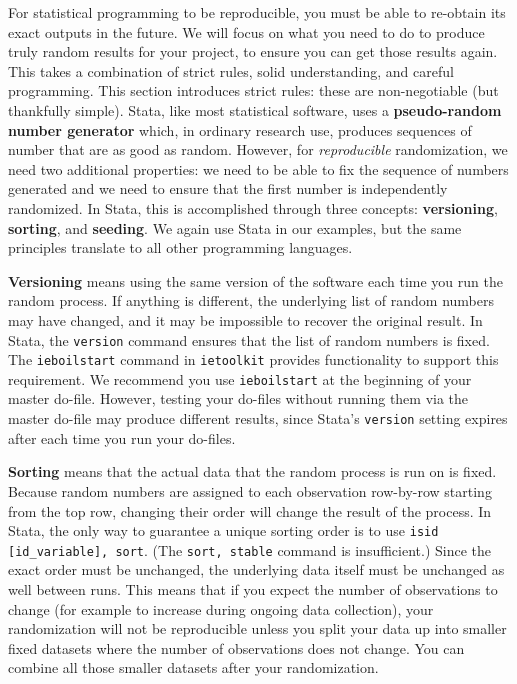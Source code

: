 For statistical programming to be reproducible,
you must be able to re-obtain its exact outputs in the future.\cite{orozco2018make}
We will focus on what you need to do to produce
truly random results for your project,
to ensure you can get those results again.
This takes a combination of strict rules, solid understanding, and careful programming.
This section introduces strict rules:
these are non-negotiable (but thankfully simple).
Stata, like most statistical software, uses a \textbf{pseudo-random number generator}
which, in ordinary research use, 
produces sequences of number that are as good as random.
However, for \textit{reproducible} randomization, we need two additional properties:
we need to be able to fix the sequence of numbers generated and
we need to ensure that the first number is independently randomized.
In Stata, this is accomplished through three concepts:
\textbf{versioning}, \textbf{sorting}, and \textbf{seeding}.
We again use Stata in our examples,
but the same principles translate to all other programming languages.

\textbf{Versioning} means using the same version of the software each time you run the random process.
If anything is different, the underlying list of random numbers may have changed,
and it may be impossible to recover the original result.
In Stata, the \texttt{version} command ensures that the list of random numbers is fixed.
The \texttt{ieboilstart} command in \texttt{ietoolkit} provides functionality to support this requirement.
We recommend you use \texttt{ieboilstart} at the beginning of your master do-file.
However, testing your do-files without running them
via the master do-file may produce different results,
since Stata's \texttt{version} setting expires after each time you run your do-files.

\textbf{Sorting} means that the actual data that the random process is run on is fixed.
Because random numbers are assigned to each observation row-by-row starting from
the top row,
changing their order will change the result of the process.
In Stata, the only way to guarantee a unique sorting order is to use
\texttt{isid [id\_variable], sort}.
(The \texttt{sort, stable} command is insufficient.)
Since the exact order must be unchanged,
the underlying data itself must be unchanged as well between runs.
This means that if you expect the number of observations to change
(for example to increase during ongoing data collection),
your randomization will not be reproducible unless you split your data up into
smaller fixed datasets where the number of observations does not change.
You can combine all
those smaller datasets after your randomization.


